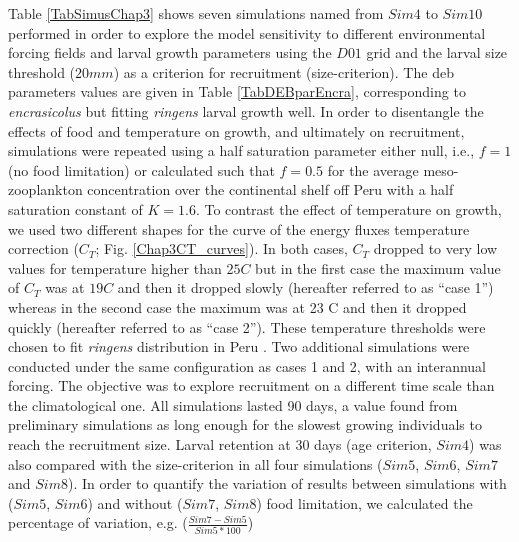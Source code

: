 Table \ref{TabSimusChap3} shows seven simulations named from $Sim4$ to $Sim10$ performed in order
to explore the model sensitivity to different environmental forcing fields and larval growth
parameters using the $D01$ grid and the larval size threshold ($20 mm$) as a criterion for
recruitment (size-criterion). The \acrshort{deb} parameters values are given in Table \ref{TabDEBparEncra}, corresponding to \textit{\gls{encrasicolus}} \citep{PethRoos2013} but fitting \textit{\gls{ringens}} larval growth well. In order to disentangle the effects of food and temperature on growth, and ultimately on recruitment, simulations were repeated using a half saturation parameter either null, i.e., $f = 1$ (no food limitation) or calculated such that $f = 0.5$ for the average meso-zooplankton concentration over the continental shelf off Peru with a half saturation constant of $K = 1.6$. To contrast the effect of temperature on growth, we used two different shapes for the curve of the energy fluxes temperature correction ($C_{T}$; Fig. \ref{Chap3CT_curves}). In both cases, $C_{T}$ dropped to very low values for temperature higher than $25$\textdegree $C$ but in the first case the maximum value of $C_{T}$ was at $19$\textdegree $C$ and then it dropped slowly (hereafter referred to as ``case 1'') whereas in the second case the maximum was at 23 \textdegree C and then it dropped quickly (hereafter referred to as ``case 2''). These temperature thresholds were chosen to fit \textit{\gls{ringens}} distribution in Peru \citep{CastPena2022}. Two additional simulations were conducted under the same configuration as cases 1 and 2, with an interannual forcing. The objective was to explore recruitment on a different time scale than the climatological one. All simulations lasted 90 days, a value found from preliminary simulations as long enough for the slowest growing individuals to reach the recruitment size. Larval retention at 30 days (age criterion, $Sim 4$) was also compared with the size-criterion in all four simulations ($Sim 5$, $Sim 6$, $Sim 7$ and $Sim 8$). In order to quantify the variation of results between simulations with ($Sim 5$, $Sim 6$) and without ($Sim 7$, $Sim 8$) food limitation, we calculated the percentage of variation, e.g. ($\frac{Sim 7-Sim 5}{Sim 5*100}$)

